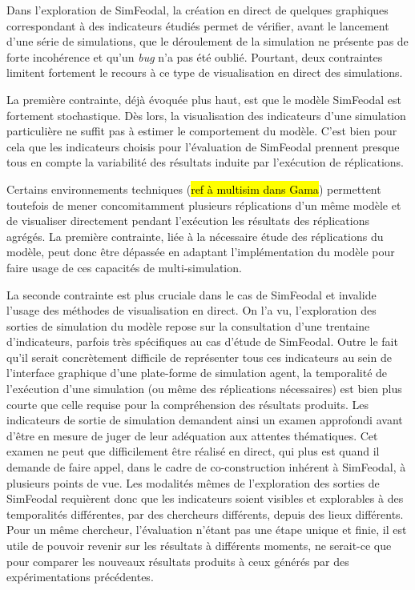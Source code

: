 	Dans l'exploration de SimFeodal, la création en direct de quelques graphiques correspondant à des indicateurs étudiés permet de vérifier, avant le lancement d'une série de simulations, que le déroulement de la simulation ne présente pas de forte incohérence et qu'un \textit{bug} n'a pas été oublié.
	Pourtant, deux contraintes limitent fortement le recours à ce type de visualisation en direct des simulations.

	La première contrainte, déjà évoquée plus haut, est que le modèle SimFeodal est fortement stochastique.
	Dès lors, la visualisation des indicateurs d'une simulation particulière ne suffit pas à estimer le comportement du modèle.
	C'est bien pour cela que les indicateurs choisis pour l'évaluation de SimFeodal prennent presque tous en compte la variabilité des résultats induite par l'exécution de réplications.

	Certains environnements techniques (\hl{ref à multisim dans Gama}) permettent toutefois de mener concomitamment plusieurs réplications d'un même modèle et de visualiser directement pendant l'exécution les résultats des réplications agrégés.
	La première contrainte, liée à la nécessaire étude des réplications du modèle, peut donc être dépassée en adaptant l'implémentation du modèle pour faire usage de ces capacités de multi-simulation.

	La seconde contrainte est plus cruciale dans le cas de SimFeodal et invalide l'usage des méthodes de visualisation en direct.
	On l'a vu, l'exploration des sorties de simulation du modèle repose sur la consultation d'une trentaine d'indicateurs, parfois très spécifiques au cas d'étude de SimFeodal.
	Outre le fait qu'il serait concrètement difficile de représenter tous ces indicateurs au sein de l'interface graphique d'une plate-forme de simulation agent, la temporalité de l'exécution d'une simulation (ou même des réplications nécessaires) est bien plus courte que celle requise pour la compréhension des résultats produits.
	Les indicateurs de sortie de simulation demandent ainsi un examen approfondi avant d'être en mesure de juger de leur adéquation aux attentes thématiques.
	Cet examen ne peut que difficilement être réalisé en direct, qui plus est quand il demande de faire appel, dans le cadre de co-construction inhérent à SimFeodal, à plusieurs points de vue.
	Les modalités mêmes de l'exploration des sorties de SimFeodal requièrent donc que les indicateurs soient visibles et explorables à des temporalités différentes, par des chercheurs différents, depuis des lieux différents.
	Pour un même chercheur, l'évaluation n'étant pas une étape unique et finie, il est utile de pouvoir revenir sur les résultats à différents moments, ne serait-ce que pour comparer les nouveaux résultats produits à ceux générés par des expérimentations précédentes.

